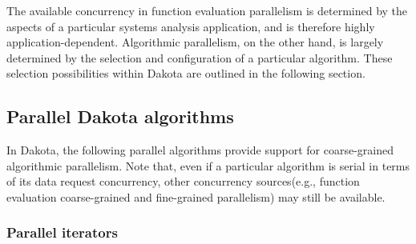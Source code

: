 The available concurrency in function evaluation parallelism is
determined by the aspects of a particular systems analysis
application, and is therefore highly application-dependent.
Algorithmic parallelism, on the other hand, is largely determined by
the selection and configuration of a particular algorithm.  These
selection possibilities within Dakota are outlined in the following
section.


\subsection{Parallel Dakota algorithms} \label{parallel:algorithms}

In Dakota, the following parallel algorithms provide support for 
coarse-grained algorithmic parallelism.  Note that, even if a 
particular algorithm is serial in terms of its data request 
concurrency, other concurrency sources(e.g., function evaluation 
coarse-grained and fine-grained parallelism) may still be available.

\subsubsection{Parallel iterators}\label{parallel:algorithms:iterators}

